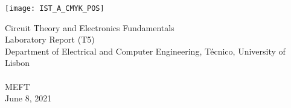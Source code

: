 
\thispagestyle {empty}

\texttt{[image: IST\_A\_CMYK\_POS]}

\begin{center}
%
\vspace{1.0cm}

\vspace{1cm}
{\FontLb Circuit Theory and Electronics Fundamentals} \\ %
\vspace{1cm}
{\FontLb Laboratory Report (T5)} \\
\vspace{1cm}
{\FontSn Department of Electrical and Computer Engineering, Técnico, University of Lisbon} \\ %
\vspace{0.5cm}
{ } \\
\vspace{0.5cm}
{\FontSn MEFT } \\
\vspace{0.5cm}
{\FontSn June 8, 2021} \\ %
%
\end{center}

